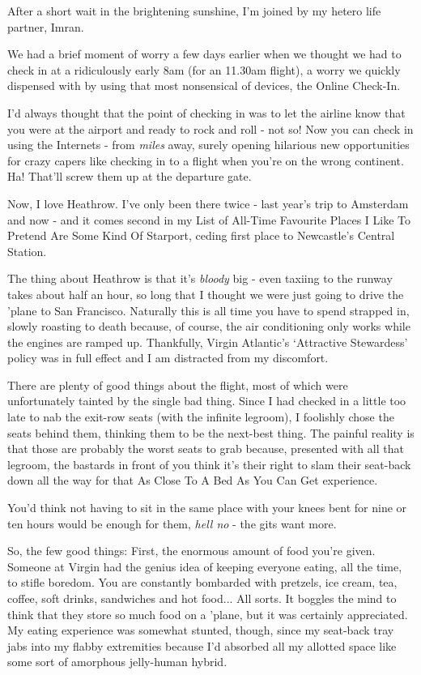 \documentclass[a5paper,titlepage,11pt]{book}
\begin{document}
After a short wait in the brightening sunshine, I'm joined by my hetero life partner, Imran.

We had a brief moment of worry a few days earlier when we thought we had to check in at a ridiculously early 8am (for an 11.30am flight), a worry we quickly dispensed with by using that most nonsensical of devices, the Online Check-In.

I'd always thought that the point of checking in was to let the airline know that you were at the airport and ready to rock and roll - not so!  Now you can check in using the Internets - from \emph{miles} away, surely opening hilarious new opportunities for crazy capers like checking in to a flight when you're on the wrong continent. Ha!  That'll screw them up at the departure gate.

Now, I love Heathrow. I've only been there twice - last year's trip to Amsterdam and now - and it comes second in my List of All-Time Favourite Places I Like To Pretend Are Some Kind Of Starport, ceding first place to Newcastle's Central Station.

The thing about Heathrow is that it's \emph{bloody} big - even taxiing to the runway takes about half an hour, so long that I thought we were just going to drive the 'plane to San Francisco. Naturally this is all time you have to spend strapped in, slowly roasting to death because, of course, the air conditioning only works while the engines are ramped up. Thankfully, Virgin Atlantic's `Attractive Stewardess' policy was in full effect and I am distracted from my discomfort.

There are plenty of good things about the flight, most of which were unfortunately tainted by the single bad thing. Since I had checked in a little too late to nab the exit-row seats (with the infinite legroom), I foolishly chose the seats behind them, thinking them to be the next-best thing.  The painful reality is that those are probably the worst seats to grab because, presented with all that legroom, the bastards in front of you think it's their right to slam their seat-back down all the way for that As Close To A Bed As You Can Get experience.

You'd think not having to sit in the same place with your knees bent for nine or ten hours would be enough for them, \emph{hell no} - the gits want more.

So, the few good things:  First, the enormous amount of food you're given. Someone at Virgin had the genius idea of keeping everyone eating, all the time, to stifle boredom. You are constantly bombarded with pretzels, ice cream, tea, coffee, soft drinks, sandwiches and hot food... All sorts. It boggles the mind to think that they store so much food on a 'plane, but it was certainly appreciated. My eating experience was somewhat stunted, though, since my seat-back tray jabs into my flabby extremities because I'd absorbed all my allotted space like some sort of amorphous jelly-human hybrid.
\end{document}
